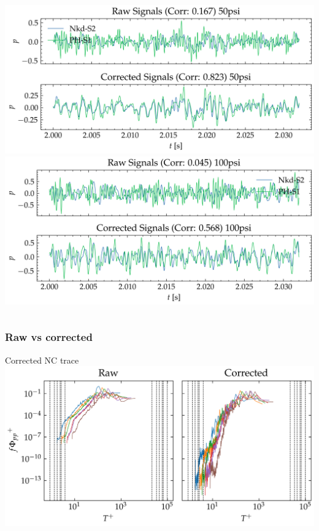 \documentclass[aspectratio=169,10pt]{beamer}
\begin{document}
\begin{frame}
\begin{columns}[c]
            \includegraphics[width=\linewidth]{PH-NKD/y_50psi.png}
            \includegraphics[width=\linewidth]{PH-NKD/y_100psi.png}
    \end{columns}
\end{frame}

\begin{frame}
    \frametitle{Raw vs corrected}
    \centering
    Corrected NC trace
    \includegraphics[width=\linewidth]{real/spectra/Pyy_log.png}
            
\end{frame}
\end{document}
